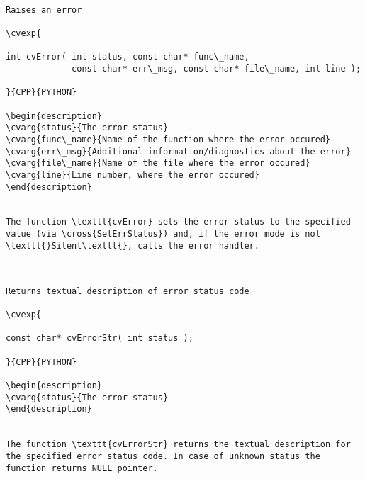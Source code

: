 \label{Error}
\begin{verbatim}

Raises an error

\cvexp{

int cvError( int status, const char* func\_name,
             const char* err\_msg, const char* file\_name, int line );

}{CPP}{PYTHON}

\begin{description}
\cvarg{status}{The error status}
\cvarg{func\_name}{Name of the function where the error occured}
\cvarg{err\_msg}{Additional information/diagnostics about the error}
\cvarg{file\_name}{Name of the file where the error occured}
\cvarg{line}{Line number, where the error occured}
\end{description}


The function \texttt{cvError} sets the error status to the specified value (via \cross{SetErrStatus}) and, if the error mode is not \texttt{}Silent\texttt{}, calls the error handler.


\end{verbatim}
\label{ErrorStr}
\begin{verbatim}

Returns textual description of error status code

\cvexp{

const char* cvErrorStr( int status );

}{CPP}{PYTHON}

\begin{description}
\cvarg{status}{The error status}
\end{description}


The function \texttt{cvErrorStr} returns the textual description for the specified error status code. In case of unknown status the function returns NULL pointer.


\end{verbatim}
\label{RedirectError}
